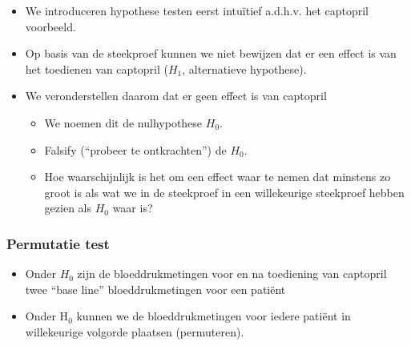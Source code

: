 \documentclass[
  12pt,dutch,coursenotes]{book}
\theoremstyle{definition}
\theoremstyle{definition}
\theoremstyle{definition}
\theoremstyle{remark}
\begin{document}
\begin{itemize}
\item
  We introduceren hypothese testen eerst intuïtief a.d.h.v. het captopril voorbeeld.
\item
  Op basis van de steekproef kunnen we niet bewijzen dat er een effect is van het toedienen van captopril (\(H_1\), alternatieve hypothese).
\item
  We veronderstellen daarom dat er geen effect is van captopril

  \begin{itemize}
  \item
    We noemen dit de nulhypothese \(H_0\).
  \item
    Falsify (``probeer te ontkrachten'') de \(H_0\).
  \item
    Hoe waarschijnlijk is het om een effect waar te nemen dat minstens zo groot is als wat we in de steekproef in een willekeurige steekproef hebben gezien als \(H_0\) waar is?
  \end{itemize}
\end{itemize}

\hypertarget{permutatie-test}{%
\subsubsection{Permutatie test}\label{permutatie-test}}

\begin{itemize}
\item
  Onder \(H_0\) zijn de bloeddrukmetingen voor en na toediening van captopril twee ``base line'' bloeddrukmetingen voor een patiënt
\item
  Onder H\(_0\) kunnen we de bloeddrukmetingen voor iedere patiënt in willekeurige volgorde plaatsen (permuteren).
\end{itemize}
\end{document}
